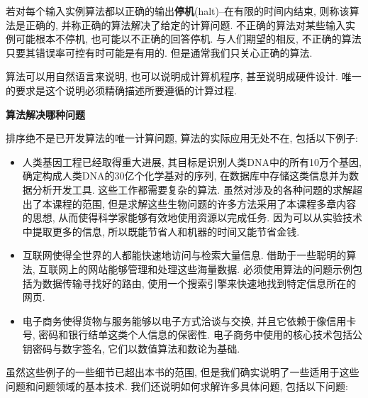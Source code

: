 \documentclass[oneside,10pt,fontset=none]{ctexbook}
\numberwithin{definition}{chapter}
\numberwithin{theorem}{chapter}
\numberwithin{proof}{chapter}
\begin{document}
若对每个输入实例算法都以正确的输出\textbf{停机}(halt)--在有限的时间内结束, 则称该算法是正确的, 并称正确的算法解决了给定的计算问题. 不正确的算法对某些输入实例可能根本不停机, 也可能以不正确的回答停机. 与人们期望的相反, 不正确的算法只要其错误率可控有时可能是有用的. 但是通常我们只关心正确的算法.

算法可以用自然语言来说明, 也可以说明成计算机程序, 甚至说明成硬件设计. 唯一的要求是这个说明必须精确描述所要遵循的计算过程.

\textbf{算法解决哪种问题}

排序绝不是已开发算法的唯一计算问题, 算法的实际应用无处不在, 包括以下例子:

\begin{itemize}
    \item 人类基因工程已经取得重大进展, 其目标是识别人类DNA中的所有10万个基因, 确定构成人类DNA的30亿个化学基对的序列, 在数据库中存储这类信息并为数据分析开发工具. 这些工作都需要复杂的算法. 虽然对涉及的各种问题的求解超出了本课程的范围, 但是求解这些生物问题的许多方法采用了本课程多章内容的思想, 从而使得科学家能够有效地使用资源以完成任务. 因为可以从实验技术中提取更多的信息, 所以既能节省人和机器的时间又能节省金钱.
    \item 互联网使得全世界的人都能快速地访问与检索大量信息. 借助于一些聪明的算法, 互联网上的网站能够管理和处理这些海量数据. 必须使用算法的问题示例包括为数据传输寻找好的路由, 使用一个搜索引擎来快速地找到特定信息所在的网页.
    \item 电子商务使得货物与服务能够以电子方式洽谈与交换, 并且它依赖于像信用卡号, 密码和银行结单这类个人信息的保密性. 电子商务中使用的核心技术包括公钥密码与数字签名, 它们以数值算法和数论为基础.
\end{itemize}

虽然这些例子的一些细节已超出本书的范围, 但是我们确实说明了一些适用于这些问题和问题领域的基本技术. 我们还说明如何求解许多具体问题, 包括以下问题:
\end{document}
